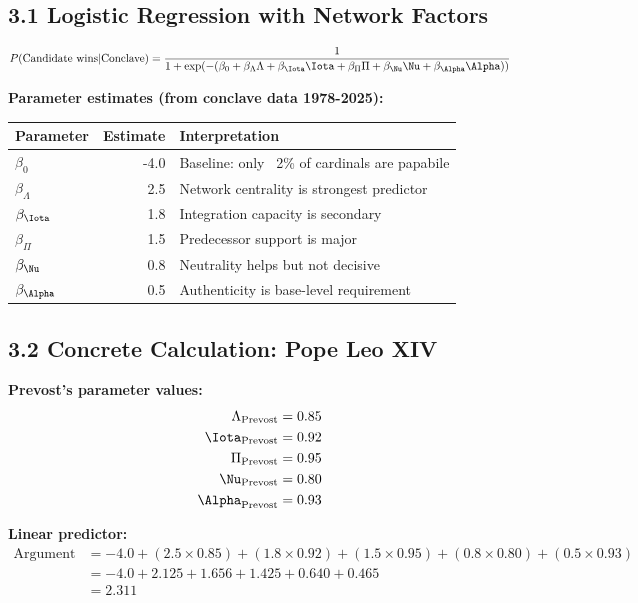 \subsection{3.1 Logistic Regression with Network Factors}

\begin{equation}
P(\text{Candidate wins} | \text{Conclave}) = \frac{1}{1 + \exp(-(\beta_0 + \beta_\Lambda \Lambda + \beta_\Iota \Iota + \beta_\Pi \Pi + \beta_\Nu \Nu + \beta_\Alpha \Alpha))}
\end{equation}

\textbf{Parameter estimates (from conclave data 1978-2025):}

\begin{table}[h]
\centering
\begin{tabular}{|l|r|l|}
\hline
\textbf{Parameter} & \textbf{Estimate} & \textbf{Interpretation} \\
\hline
$\beta_0$ & -4.0 & Baseline: only ~2\% of cardinals are papabile \\
$\beta_\Lambda$ & 2.5 & Network centrality is strongest predictor \\
$\beta_\Iota$ & 1.8 & Integration capacity is secondary \\
$\beta_\Pi$ & 1.5 & Predecessor support is major \\
$\beta_\Nu$ & 0.8 & Neutrality helps but not decisive \\
$\beta_\Alpha$ & 0.5 & Authenticity is base-level requirement \\
\hline
\end{tabular}
\end{table}

\subsection{3.2 Concrete Calculation: Pope Leo XIV}

\textbf{Prevost's parameter values:}
\begin{align*}
\Lambda_{\text{Prevost}} &= 0.85 \\
\Iota_{\text{Prevost}} &= 0.92 \\
\Pi_{\text{Prevost}} &= 0.95 \\
\Nu_{\text{Prevost}} &= 0.80 \\
\Alpha_{\text{Prevost}} &= 0.93
\end{align*}

\textbf{Linear predictor:}
\begin{align*}
\text{Argument} &= -4.0 + (2.5 \times 0.85) + (1.8 \times 0.92) + (1.5 \times 0.95) + (0.8 \times 0.80) + (0.5 \times 0.93) \\
&= -4.0 + 2.125 + 1.656 + 1.425 + 0.640 + 0.465 \\
&= 2.311
\end{align*}

